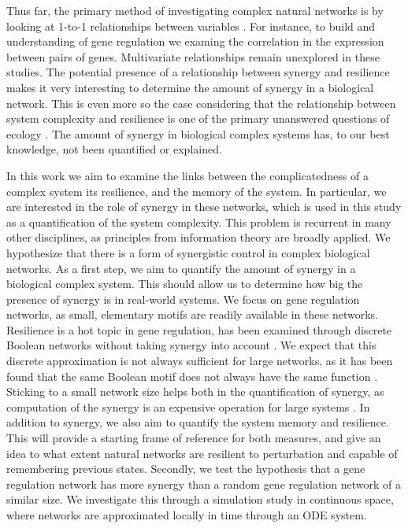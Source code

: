 \documentclass[../main.tex]{subfiles}
\begin{document}
Thus far, the primary method of investigating complex natural networks is by looking at 1-to-1 relationships between variables \cite{}. %
For instance, to build and understanding of gene regulation we examing the correlation in the expression between pairs of genes.
Multivariate relationships remain unexplored in these studies. 
The potential presence of a relationship between synergy and resilience makes it very interesting to determine the amount of synergy in a biological network. 
This is even more so the case considering that the relationship between system complexity and resilience is one of the primary unanswered questions of ecology \cite{}.
The amount of synergy in biological complex systems has, to our best knowledge, not been quantified or explained.

In this work we aim to examine the links between the complicatedness of a complex system its resilience, and the memory of the system.
In particular, we are interested in the role of synergy in these networks, which is used in this study as a quantification of the system complexity.
This problem is recurrent in many other disciplines, as principles from information theory are broadly applied.
We hypothesize that there is a form of synergistic control in complex biological networks.
As a first step, we aim to quantify the amount of synergy in a biological complex system.
This should allow us to determine how big the presence of synergy is in real-world systems.
We focus on gene regulation networks, as small, elementary motifs are readily available in these networks.
Resilience is a hot topic in gene regulation, has been examined through discrete Boolean networks without taking synergy into account \cite{peixoto2012emergence}.
We expect that this discrete approximation is not always sufficient for large networks, as it has been found that the same Boolean motif does not always have the same function \cite{ingram2006network}.
Sticking to a small network size helps both in the quantification of synergy, as computation of the synergy is an expensive operation for large systems \cite{jointpdf}.
In addition to synergy, we also aim to quantify the system memory and resilience.
This will provide a starting frame of reference for both measures, and give an idea to what extent natural networks are resilient to perturbation and capable of remembering previous states.
Secondly, we test the hypothesis that a gene regulation network has more synergy than a random gene regulation network of a similar size. 
We investigate this through a simulation study in continuous space, where networks are approximated locally in time through an ODE system.
\end{document}
